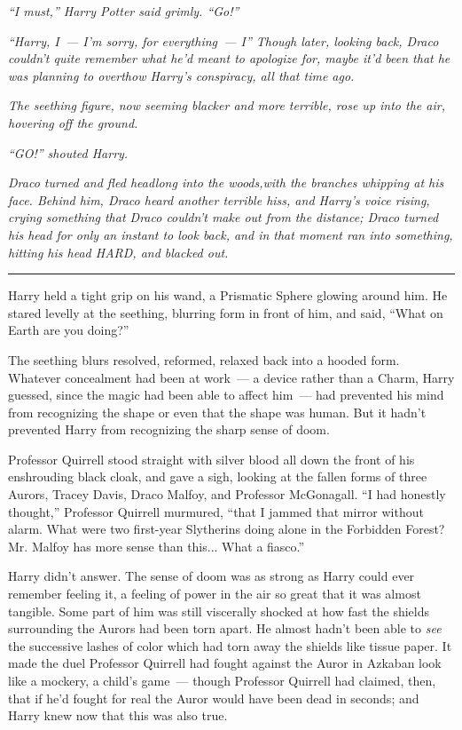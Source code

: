 \emph{``I must,'' Harry Potter said grimly. ``Go!''}

\emph{``Harry, I~--- I'm sorry, for everything~--- I'' Though later, looking back, Draco couldn't quite remember what he'd meant to apologize for, maybe it'd been that he was planning to overthow Harry's conspiracy, all that time ago.}

\emph{The seething figure, now seeming blacker and more terrible, rose up into the air, hovering off the ground.}

\emph{``GO!'' shouted Harry.}

\emph{Draco turned and fled headlong into the woods,with the branches whipping at his face. Behind him, Draco heard another terrible hiss, and Harry's voice rising, crying something that Draco couldn't make out from the distance; Draco turned his head for only an instant to look back, and in that moment ran into something, hitting his head HARD, and blacked out.}

\begin{center}\rule{3in}{0.4pt}\end{center}

Harry held a tight grip on his wand, a Prismatic Sphere glowing around him. He stared levelly at the seething, blurring form in front of him, and said, ``What on Earth are you doing?''

The seething blurs resolved, reformed, relaxed back into a hooded form. Whatever concealment had been at work~--- a device rather than a Charm, Harry guessed, since the magic had been able to affect him~--- had prevented his mind from recognizing the shape or even that the shape was human. But it hadn't prevented Harry from recognizing the sharp sense of doom.

Professor Quirrell stood straight with silver blood all down the front of his enshrouding black cloak, and gave a sigh, looking at the fallen forms of three Aurors, Tracey Davis, Draco Malfoy, and Professor McGonagall. ``I had honestly thought,'' Professor Quirrell murmured, ``that I jammed that mirror without alarm. What were two first-year Slytherins doing alone in the Forbidden Forest? Mr. Malfoy has more sense than this... What a fiasco.''

Harry didn't answer. The sense of doom was as strong as Harry could ever remember feeling it, a feeling of power in the air so great that it was almost tangible. Some part of him was still viscerally shocked at how fast the shields surrounding the Aurors had been torn apart. He almost hadn't been able to \emph{see} the successive lashes of color which had torn away the shields like tissue paper. It made the duel Professor Quirrell had fought against the Auror in Azkaban look like a mockery, a child's game~--- though Professor Quirrell had claimed, then, that if he'd fought for real the Auror would have been dead in seconds; and Harry knew now that this was also true.

